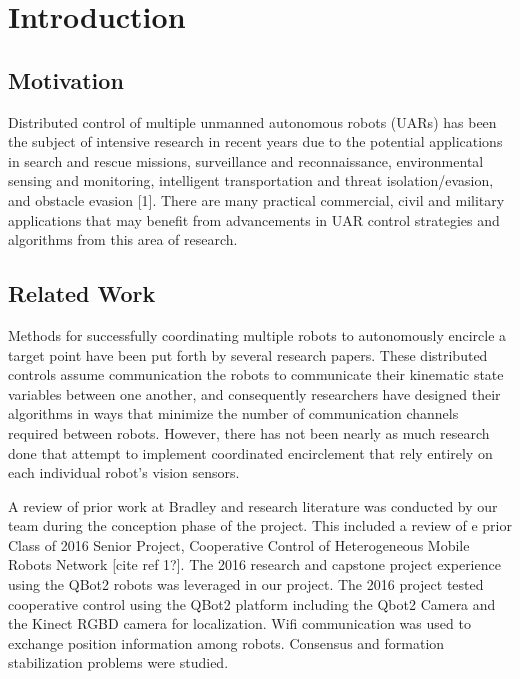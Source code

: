\documentclass[conference]{IEEEtran}
\begin{document}
%
\IEEEpeerreviewmaketitle



\section{Introduction}

\subsection{Motivation}

Distributed control of multiple unmanned autonomous robots (UARs) has been the subject of intensive research in recent years due to the potential applications in search and rescue missions, surveillance and reconnaissance, environmental sensing and monitoring, intelligent transportation and threat isolation/evasion, and obstacle evasion [1]. There are many practical commercial, civil and military applications that may benefit from advancements in UAR control strategies and algorithms from this area of research. 

\subsection{Related Work}
Methods for successfully coordinating multiple robots to autonomously encircle a target point have been put forth by several research papers.  These distributed controls assume communication the robots to communicate their kinematic state variables between one another, and consequently researchers have designed their algorithms in ways that minimize the number of communication channels required between robots.  However, there has not been nearly as much research done that attempt to implement coordinated encirclement that rely entirely on each individual robot’s vision sensors.

A review of prior work at Bradley and research literature was conducted by our team during the conception phase of the project.  This included a review of e prior Class of 2016 Senior Project, Cooperative Control of Heterogeneous Mobile Robots Network [cite ref 1?]. The 2016 research and capstone project experience using the QBot2 robots was leveraged in our project. The 2016 project tested cooperative control using the QBot2 platform including the Qbot2 Camera and the Kinect RGBD camera for localization.  Wiﬁ communication was used to exchange position information among robots. Consensus and formation stabilization problems were studied. 
\end{document}
